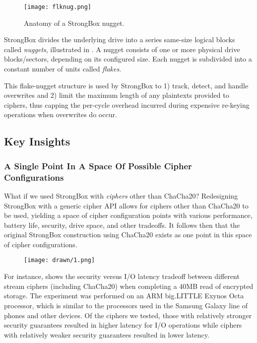 \begin{figure}[ht]
   \centering
   \texttt{[image: flknug.png]}
   \caption{Anatomy of a StrongBox nugget.}\label{fig:flknug}
\end{figure}

StrongBox divides the underlying drive into a series same-size logical blocks
called \emph{nuggets}, illustrated in . A nugget consists of one
or more physical drive blocks/sectors, depending on its configured size. Each
nugget is subdivided into a constant number of units called \emph{flakes}.

This flake-nugget structure is used by StrongBox to 1) track, detect, and handle
overwrites and 2) limit the maximum length of any plaintexts provided to
ciphers, thus capping the per-cycle overhead incurred during expensive re-keying
operations when overwrites do occur.

\subsection{Key Insights}

\subsubsection{A Single Point In A Space Of Possible Cipher Configurations}

What if we used StrongBox with \textit{ciphers} other than ChaCha20? Redesigning
StrongBox with a generic cipher API allows for ciphers other than ChaCha20 to be
used, yielding a space of cipher configuration points with various performance,
battery life, security, drive space, and other tradeoffs. It follows then that
the original StrongBox construction using ChaCha20 exists as one point in this
space of cipher configurations.

\begin{figure}[ht]
   \centering
   \texttt{[image: drawn/1.png]}
   \caption{}\label{fig:40mb-read}
\end{figure}

For instance,  shows the security versus I/O latency tradeoff
between different stream ciphers (including ChaCha20) when completing a 40MB
read of encrypted storage. The experiment was performed on an ARM big.LITTLE
Exynos Octa processor, which is similar to the processors used in the Samsung
Galaxy line of phones and other devices. Of the ciphers we tested, those with
relatively stronger security guarantees resulted in higher latency for I/O
operations while ciphers with relatively weaker security guarantees resulted in
lower latency.

